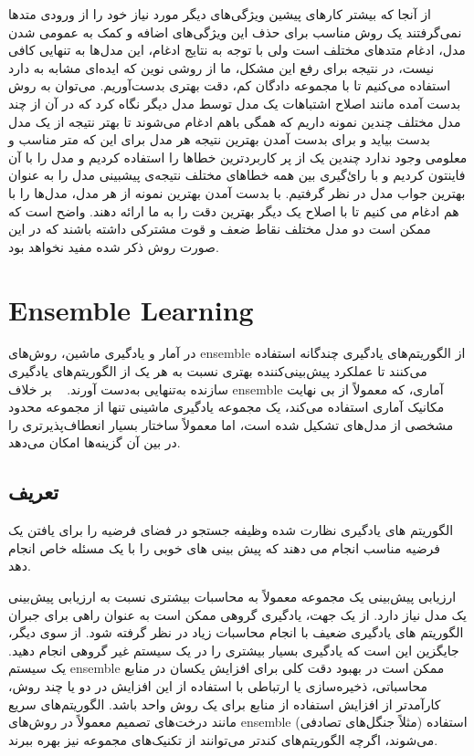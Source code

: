 \documentclass[12pt,a4paper,BCOR=.7cm,headsepline,bibliography=totoc]{report}
\begin{document}
 از آنجا که بیشتر کار‌های پیشین ویژگی‌های دیگر مورد نیاز خود را از ورودی متد‌ها نمی‌گرفتند یک روش مناسب برای حذف این ویژگی‌های اضافه و کمک به عمومی شدن مدل، ادغام متد‌های مختلف است ولی با توجه به نتایج ادغام، این مدل‌ها به تنهایی کافی نیست، در نتیجه برای رفع این مشکل، ما از روشی نوین که ایده‌ای مشابه به   \cite{Stacking} دارد استفاده می‌کنیم تا با مجموعه دادگان کم، دقت بهتری بدست‌آوریم. می‌توان به روش بدست آمده مانند اصلاح اشتباهات یک مدل توسط مدل دیگر نگاه کرد که در آن از چند مدل مختلف چندین نمونه داریم که همگی باهم ادغام می‌شوند تا بهتر نتیجه از یک مدل بدست بیاید و برای بدست آمدن بهترین نتیجه هر مدل برای این که متر مناسب و معلومی وجود ندارد چندین یک از پر کاربردترین خطا‌ها را استفاده کردیم و مدل را با آن فاینتون کردیم و با رائ‌گیری بین همه خطا‌های مختلف نتیجه‌ی پیشبینی مدل را به عنوان بهترین جواب مدل در نظر گرفتیم. با بدست آمدن بهترین نمونه از هر مدل، مدل‌ها را با هم ادغام می کنیم تا با اصلاح یک دیگر بهترین دقت را به ما ارائه دهند. واضح است که ممکن است دو مدل مختلف نقاط ضعف و قوت مشترکی داشته باشند که در این صورت روش ذکر شده مفید نخواهد بود.
\section{Ensemble Learning}
در آمار و یادگیری ماشین، روش‌های ensemble از الگوریتم‌های یادگیری چندگانه استفاده می‌کنند تا عملکرد پیش‌بینی‌کننده بهتری نسبت به هر یک از الگوریتم‌های یادگیری سازنده به‌تنهایی به‌دست آورند. ~\cite{Opitz, Polikar, Rokach} بر خلاف ensemble آماری، که معمولاً از بی نهایت مکانیک آماری استفاده می‌کند، یک مجموعه یادگیری ماشینی تنها از مجموعه محدود مشخصی از مدل‌های تشکیل شده است، اما معمولاً ساختار بسیار انعطاف‌پذیرتری را در بین آن گزینه‌ها امکان می‌دهد.
\subsection{تعریف}
الگوریتم های یادگیری نظارت شده وظیفه جستجو در فضای فرضیه را برای یافتن یک فرضیه مناسب انجام می دهند که پیش بینی های خوبی را با یک مسئله خاص انجام دهد.~\cite{Blockeel}

ارزیابی پیش‌بینی یک مجموعه معمولاً به محاسبات بیشتری نسبت به ارزیابی پیش‌بینی یک مدل نیاز دارد. از یک جهت، یادگیری گروهی ممکن است به عنوان راهی برای جبران الگوریتم های یادگیری ضعیف با انجام محاسبات زیاد در نظر گرفته شود. از سوی دیگر، جایگزین این است که یادگیری بسیار بیشتری را در یک سیستم غیر گروهی انجام دهید. یک سیستم ensemble ممکن است در بهبود دقت کلی برای افزایش یکسان در منابع محاسباتی، ذخیره‌سازی یا ارتباطی با استفاده از این افزایش در دو یا چند روش، کارآمدتر از افزایش استفاده از منابع برای یک روش واحد باشد. الگوریتم‌های سریع مانند درخت‌های تصمیم معمولاً در روش‌های ensemble (مثلاً جنگل‌های تصادفی) استفاده می‌شوند، اگرچه الگوریتم‌های کندتر می‌توانند از تکنیک‌های مجموعه نیز بهره ببرند.
\end{document}

